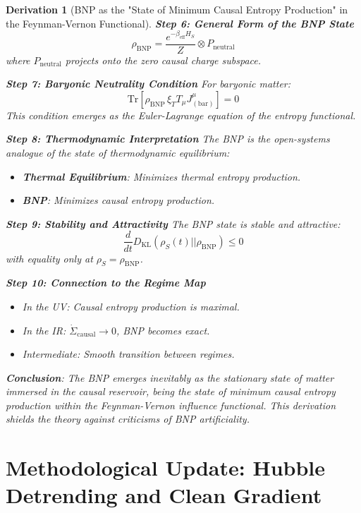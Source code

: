 \documentclass[10pt, a4paper]{article}
\newcommand{\Tr}{\text{Tr}}
\newcommand{\xiT}{\xi_T}       %
\newtheorem{derivation}{Derivation}
\begin{document}
\begin{derivation}[BNP as the "State of Minimum Causal Entropy Production" in the Feynman-Vernon Functional]
\textbf{Step 6: General Form of the BNP State}
\begin{equation}
\rho_{\text{BNP}} = \frac{e^{-\beta_{\text{eff}} H_S}}{Z} \otimes P_{\text{neutral}}
\tag{3.9}
\end{equation}
where $P_{\text{neutral}}$ projects onto the zero causal charge subspace.

\textbf{Step 7: Baryonic Neutrality Condition}
For baryonic matter:
\begin{equation}
\Tr[\rho_{\text{BNP}} \, \xiT T_\mu J^\mu_{(\text{bar})}] = 0
\tag{3.10}
\end{equation}
This condition emerges as the Euler-Lagrange equation of the entropy functional.

\textbf{Step 8: Thermodynamic Interpretation}
The BNP is the open-systems analogue of the state of thermodynamic equilibrium:
\begin{itemize}
\item \textbf{Thermal Equilibrium}: Minimizes thermal entropy production.
\item \textbf{BNP}: Minimizes causal entropy production.
\end{itemize}

\textbf{Step 9: Stability and Attractivity}
The BNP state is stable and attractive:
\begin{equation}
\frac{d}{dt} D_{\text{KL}}(\rho_S(t) || \rho_{\text{BNP}}) \leq 0
\tag{3.11}
\end{equation}
with equality only at $\rho_S = \rho_{\text{BNP}}$.

\textbf{Step 10: Connection to the Regime Map}
\begin{itemize}
\item In the UV: Causal entropy production is maximal.
\item In the IR: $\dot{\Sigma}_{\text{causal}} \to 0$, BNP becomes exact.
\item Intermediate: Smooth transition between regimes.
\end{itemize}

\textbf{Conclusion}: The BNP emerges inevitably as the stationary state of matter immersed in the causal reservoir, being the state of minimum causal entropy production within the Feynman-Vernon influence functional. This derivation shields the theory against criticisms of BNP artificiality.
\end{derivation}

\section{Methodological Update: Hubble Detrending and Clean Gradient}
\end{document}

